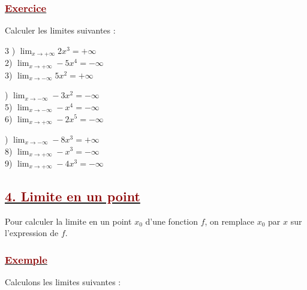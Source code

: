 \documentclass[12pt,a4paper]{article}
\begin{document}
\subsubsection*{\underline{\textcolor{darkred}{ Exercice }}}
Calculer les limites suivantes :
\begin{multicols}{3}
) $\displaystyle \lim_{x \to +\infty} 2x^3 = +\infty$ \\[0.6cm]
2) $\displaystyle \lim_{x \to +\infty} -5x^4 = -\infty$ \\[0.6cm]
3) $\displaystyle \lim_{x \to -\infty} 5x^2 = +\infty$

\columnbreak

) $\displaystyle \lim_{x \to -\infty} -3x^2 = -\infty$ \\[0.6cm]
5) $\displaystyle \lim_{x \to -\infty} -x^4 = -\infty$ \\[0.6cm]
6) $\displaystyle \lim_{x \to +\infty} -2x^5 = -\infty$

\columnbreak

) $\displaystyle \lim_{x \to -\infty} -8x^3 = +\infty$ \\[0.6cm]
8) $\displaystyle \lim_{x \to +\infty} -x^3 = -\infty$ \\[0.6cm]
9) $\displaystyle \lim_{x \to +\infty} -4x^3 = -\infty$
\end{multicols}

\subsection*{\underline{\textcolor{darkred}{ 4. Limite en un point }}}
Pour calculer la limite en un point $x_0$ d'une fonction $f$, on remplace $x_0$ par $x$ sur l'expression de $f$.
\subsubsection*{\underline{\textcolor{darkred}{ Exemple }}}
Calculons les limites suivantes :
\end{document}
